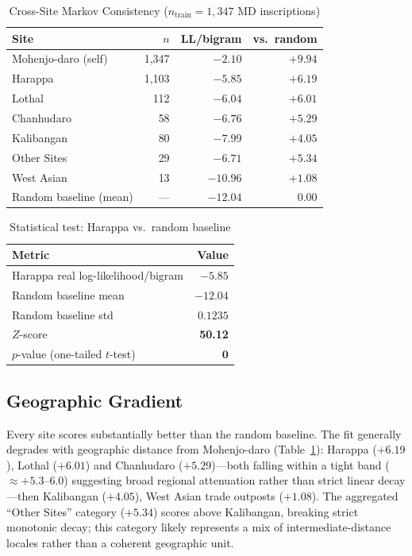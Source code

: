 \documentclass[12pt,letterpaper]{article}
\begin{document}
\begin{table}[htbp]
\centering
\caption{Cross-Site Markov Consistency ($n_{\text{train}} = 1{,}347$ MD inscriptions)}
\label{tab:crosssite}
\begin{tabular}{lrrr}
\toprule
Site & $n$ & LL/bigram & vs.\ random \\
\midrule
Mohenjo-daro (self)  & 1,347 & $-2.10$ & $+9.94$ \\
Harappa              & 1,103 & $-5.85$ & $+6.19$ \\
Lothal               &   112 & $-6.04$ & $+6.01$ \\
Chanhudaro           &    58 & $-6.76$ & $+5.29$ \\
Kalibangan           &    80 & $-7.99$ & $+4.05$ \\
Other Sites          &    29 & $-6.71$ & $+5.34$ \\
West Asian           &    13 & $-10.96$ & $+1.08$ \\
\midrule
Random baseline (mean) & --- & $-12.04$ & $0.00$ \\
\bottomrule
\end{tabular}
\end{table}

\begin{table}[htbp]
\centering
\caption{Statistical test: Harappa vs.\ random baseline}
\begin{tabular}{lr}
\toprule
Metric & Value \\
\midrule
Harappa real log-likelihood/bigram & $-5.85$ \\
Random baseline mean               & $-12.04$ \\
Random baseline std                & $0.1235$ \\
$Z$-score                          & \textbf{50.12} \\
$p$-value (one-tailed $t$-test)    & $\mathbf{0}$ \\
\bottomrule
\end{tabular}
\end{table}

\subsection{Geographic Gradient}

Every site scores substantially better than the random baseline.
The fit generally degrades with geographic distance from
Mohenjo-daro (Table~\ref{tab:crosssite}): Harappa ($+6.19$),
Lothal ($+6.01$) and Chanhudaro ($+5.29$)---both falling within a
tight band ($\approx +5.3$--$6.0$) suggesting broad regional
attenuation rather than strict linear decay---then Kalibangan ($+4.05$),
West Asian trade outposts ($+1.08$).
The aggregated ``Other Sites'' category ($+5.34$) scores above
Kalibangan, breaking strict monotonic decay; this category likely
represents a mix of intermediate-distance locales rather than a
coherent geographic unit.
\end{document}
